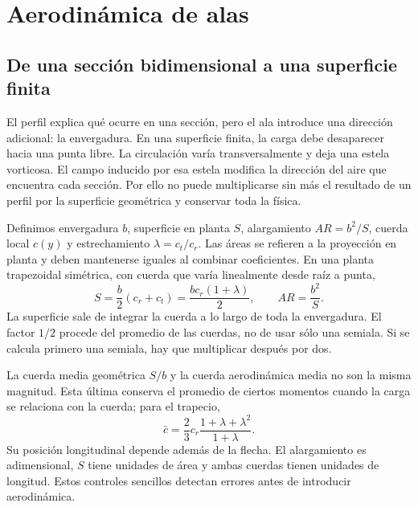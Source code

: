 \chapter{Aerodinámica de alas}\label{ch:10}

\section{De una sección bidimensional a una superficie finita}
El perfil explica qué ocurre en una sección, pero el ala introduce una dirección adicional: la envergadura. En una superficie finita, la carga debe desaparecer hacia una punta libre. La circulación varía transversalmente y deja una estela vorticosa. El campo inducido por esa estela modifica la dirección del aire que encuentra cada sección. Por ello no puede multiplicarse sin más el resultado de un perfil por la superficie geométrica y conservar toda la física.

Definimos envergadura $b$, superficie en planta $S$, alargamiento $AR=b^2/S$, cuerda local $c(y)$ y estrechamiento $\lambda=c_t/c_r$. Las áreas se refieren a la proyección en planta y deben mantenerse iguales al combinar coeficientes. En una planta trapezoidal simétrica, con cuerda que varía linealmente desde raíz a punta,
\begin{equation}\label{eq:10-geom}
S=\frac b2(c_r+c_t)=\frac{bc_r(1+\lambda)}2,\qquad
AR=\frac{b^2}{S}.
\end{equation}
La superficie sale de integrar la cuerda a lo largo de toda la envergadura. El factor $1/2$ procede del promedio de las cuerdas, no de usar sólo una semiala. Si se calcula primero una semiala, hay que multiplicar después por dos.

La cuerda media geométrica $S/b$ y la cuerda aerodinámica media no son la misma magnitud. Esta última conserva el promedio de ciertos momentos cuando la carga se relaciona con la cuerda; para el trapecio,
\begin{equation}
\bar c=\frac{2}{3}c_r\frac{1+\lambda+\lambda^2}{1+\lambda}.
\end{equation}
Su posición longitudinal depende además de la flecha. El alargamiento es adimensional, $S$ tiene unidades de área y ambas cuerdas tienen unidades de longitud. Estos controles sencillos detectan errores antes de introducir aerodinámica.


